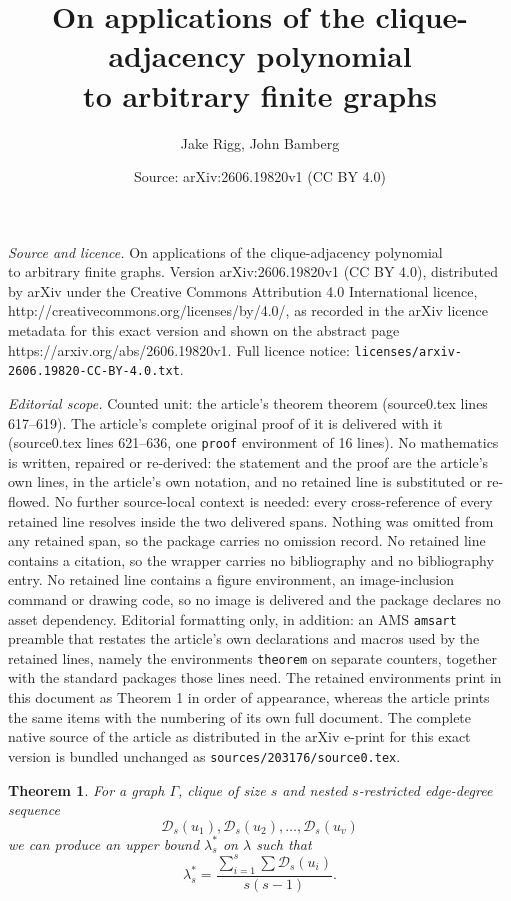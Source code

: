 \documentclass[10pt,a4paper]{amsart}
\title{On applications of the clique-adjacency polynomial\\ to arbitrary finite graphs}
\author{Jake Rigg, John Bamberg}
\date{Source: arXiv:2606.19820v1 (CC BY 4.0)}
\newtheorem{theorem}{Theorem}
\begin{document}
\maketitle

\noindent\emph{Source and licence.} On applications of the clique-adjacency polynomial\\ to arbitrary finite graphs. Version arXiv:2606.19820v1 (CC BY 4.0), distributed by arXiv under the Creative Commons Attribution 4.0 International licence, http://creativecommons.org/licenses/by/4.0/, as recorded in the arXiv licence metadata for this exact version and shown on the abstract page https://arxiv.org/abs/2606.19820v1. Full licence notice: \texttt{licenses/arxiv-2606.19820-CC-BY-4.0.txt}.\par\smallskip

\noindent\textit{Editorial scope.} Counted unit: the article's theorem theorem (source0.tex lines 617--619). The article's complete original proof of it is delivered with it (source0.tex lines 621--636, one \texttt{proof} environment of 16 lines). No mathematics is written, repaired or re-derived: the statement and the proof are the article's own lines, in the article's own notation, and no retained line is substituted or re-flowed.  No further source-local context is needed: every cross-reference of every retained line resolves inside the two delivered spans.  Nothing was omitted from any retained span, so the package carries no omission record.  No retained line contains a citation, so the wrapper carries no bibliography and no bibliography entry.  No retained line contains a figure environment, an image-inclusion command or drawing code, so no image is delivered and the package declares no asset dependency.  Editorial formatting only, in addition: an AMS \texttt{amsart} preamble that restates the article's own declarations and macros used by the retained lines, namely the environments \texttt{theorem} on separate counters, together with the standard packages those lines need.  The retained environments print in this document as Theorem 1 in order of appearance, whereas the article prints the same items with the numbering of its own full document.  The complete native source of the article as distributed in the arXiv e-print for this exact version is bundled unchanged as \texttt{sources/203176/source0.tex}.
	\begin{theorem}
	For a graph $\Gamma$, clique of size $s$ and nested $s$-restricted edge-degree sequence \[\mathcal{D}_s(u_1), \mathcal{D}_s(u_2), \dots, \mathcal{D}_s(u_v)\] we can produce an upper bound $\lambda^*_s$ on $\lambda$ such that \[\lambda_s^* = \frac{\sum_{i=1}^s \sum \mathcal{D}_s(u_i)}{s(s-1)}.\]
	\end{theorem}
\end{document}
